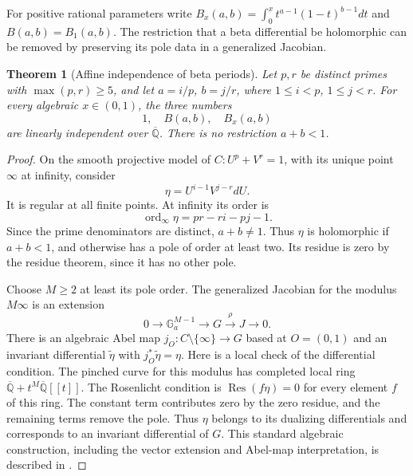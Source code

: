\documentclass[11pt,a4paper]{article}
\newtheorem{theorem}{Theorem}[section]
\theoremstyle{definition}
\theoremstyle{remark}
\numberwithin{equation}{section}
\begin{document}
For positive rational parameters write
$B_x(a,b)=\int_0^xt^{a-1}(1-t)^{b-1}dt$ and $B(a,b)=B_1(a,b)$.
The restriction that a beta differential be holomorphic can be removed
by preserving its pole data in a generalized Jacobian.

\begin{theorem}[Affine independence of beta periods]
\label{beta-thm-beta-independent}
Let $p,r$ be distinct primes with $\max(p,r)\ge5$, and let
$a=i/p$, $b=j/r$, where $1\le i<p$, $1\le j<r$.  For every algebraic
$x\in(0,1)$, the three numbers
\[
1,\quad B(a,b),\quad B_x(a,b)
\]
are linearly independent over $\overline{\mathbb Q}$.  There is no
restriction $a+b<1$.
\end{theorem}

\begin{proof}
On the smooth projective model of $C:U^p+V^r=1$, with its unique point
$\infty$ at infinity, consider
\[
\eta=U^{i-1}V^{j-r}dU.
\]
It is regular at all finite points.  At infinity its order is
\begin{equation}\label{beta-eq-beta-pole}
\operatorname{ord}_{\infty}\eta=pr-ri-pj-1.
\end{equation}
Since the prime denominators are distinct, $a+b\ne1$.  Thus $\eta$ is
holomorphic if $a+b<1$, and otherwise has a pole of order at least two.
Its residue is zero by the residue theorem, since it has no other pole.

Choose $M\ge2$ at least its pole order.  The generalized Jacobian for
the modulus $M\infty$ is an extension
\[
0\longrightarrow\mathbb G_a^{M-1}\longrightarrow G
\xrightarrow{\rho}J\longrightarrow0.
\]
There is an algebraic Abel map $j_O:C\setminus\{\infty\}\to G$ based
at $O=(0,1)$ and an invariant differential $\widetilde\eta$ with
$j_O^*\widetilde\eta=\eta$.
Here is a local check of the differential condition.  The pinched curve
for this modulus has completed local ring
$\overline{\mathbb Q}+t^M\overline{\mathbb Q}[[t]]$.
The Rosenlicht condition is $\operatorname{Res}(f\eta)=0$ for every
element $f$ of this ring.  The constant term contributes zero by the
zero residue, and the remaining terms remove the pole.  Thus $\eta$
belongs to its dualizing differentials and corresponds to an invariant
differential of $G$.  This standard algebraic construction, including
the vector extension and Abel-map interpretation, is described in
\cite{beta-zannier,beta-agostini}.


\end{proof}
\end{document}
